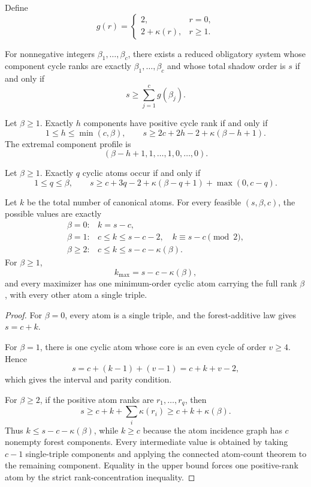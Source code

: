 Define
\[
 g(r)=
 \begin{cases}
 2,&r=0,\\
 2+\kappa(r),&r\ge1.
 \end{cases}
\]

\begin{corollary}
For nonnegative integers \(\beta_1,\ldots,\beta_c\), there exists a reduced
obligatory system whose component cycle ranks are exactly
\(\beta_1,\ldots,\beta_c\) and whose total shadow order is \(s\) if and only if
\[
 s\ge\sum_{j=1}^c g(\beta_j).
\]
\end{corollary}

\begin{corollary}
Let \(\beta\ge1\).  Exactly \(h\) components have positive cycle rank if and
only if
\[
 1\le h\le\min(c,\beta),
 \qquad
 s\ge2c+2h-2+\kappa(\beta-h+1).
\]
The extremal component profile is
\[
 (\beta-h+1,1,\ldots,1,0,\ldots,0).
\]
\end{corollary}

\begin{corollary}
Let \(\beta\ge1\).  Exactly \(q\) cyclic atoms occur if and only if
\[
 1\le q\le\beta,
 \qquad
 s\ge
 c+3q-2+\kappa(\beta-q+1)+\max(0,c-q).
\]
\end{corollary}

\begin{theorem}
Let \(k\) be the total number of canonical atoms.  For every feasible
\((s,\beta,c)\), the possible values are exactly
\[
 \begin{array}{ll}
 \beta=0:
   &k=s-c,\\[1mm]
 \beta=1:
   &c\le k\le s-c-2,\quad k\equiv s-c\pmod2,\\[1mm]
 \beta\ge2:
   &c\le k\le s-c-\kappa(\beta).
 \end{array}
\]
For \(\beta\ge1\),
\[
 k_{\max}=s-c-\kappa(\beta),
\]
and every maximizer has one minimum-order cyclic atom carrying the full rank
\(\beta\), with every other atom a single triple.
\end{theorem}

\begin{proof}
For \(\beta=0\), every atom is a single triple, and the forest-additive law
gives \(s=c+k\).

For \(\beta=1\), there is one cyclic atom whose core is an even cycle of order
\(v\ge4\).  Hence
\[
 s=c+(k-1)+(v-1)=c+k+v-2,
\]
which gives the interval and parity condition.

For \(\beta\ge2\), if the positive atom ranks are \(r_1,\ldots,r_q\), then
\[
 s\ge c+k+\sum_i\kappa(r_i)
   \ge c+k+\kappa(\beta).
\]
Thus \(k\le s-c-\kappa(\beta)\), while \(k\ge c\) because the atom incidence
graph has \(c\) nonempty forest components.  Every intermediate value is
obtained by taking \(c-1\) single-triple components and applying the connected
atom-count theorem to the remaining component.  Equality in the upper bound
forces one positive-rank atom by the strict rank-concentration inequality.
\end{proof}


